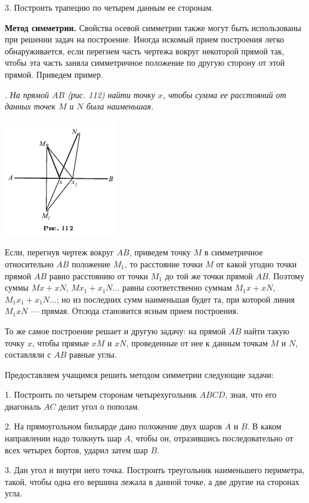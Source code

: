 \documentclass[oneside]{book}
\begin{document}
3.
Построить трапецию по четырем данным ее сторонам.



\textbf{Метод симметрии.}
Свойства осевой симметрии также могут быть использованы при решении задач на построение.
Иногда искомый прием построения легко обнаруживается, если перегнем часть чертежа вокруг некоторой прямой так, чтобы эта часть заняла симметричное положение по другую сторону от этой прямой.
Приведем пример.

.
\emph{На прямой $AB$ \emph{(рис. 112)} найти точку $x$, чтобы сумма ее расстояний от данных точек $M$ и $N$ была наименьшая.}

\includegraphics{pics/ris-112}

Если, перегнув чертеж вокруг $AB$, приведем точку $M$ в симметричное относительно $AB$ положение $M_1$, то расстояние точки $M$ от какой угодно точки прямой $AB$ равно расстоянию от точки $M_1$ до той же точки прямой $AB$.
Поэтому суммы $Mx+xN$,  $Mx_1+x_1N\dots $ равны соответственно суммам $M_1x+xN$, $M_1x_1+x_1N \dots$;
но из последних сумм наименьшая будет та, при которой линия $M_1xN$ — прямая.
Отсюда становится ясным прием построения.

То же самое построение решает и другую задачу:
на прямой $AB$ найти такую точку $x$, чтобы прямые $xM$ и $xN$, проведенные от нее к данным точкам $M$ и $N$, составляли с $AB$ равные углы.

Предоставляем учащимся решить методом симметрии следующие задачи:

\medskip

1.
Построить по четырем сторонам четырехугольник $ABCD$, зная, что его диагональ $AC$ делит угол о пополам.

2.
На прямоугольном бильярде дано положение двух шаров $A$ и $B$.
В каком направлении надо толкнуть шар $A$, чтобы он, отразившись последовательно от всех четырех бортов, ударил затем шар $B$.

3.
Дан угол и внутри него точка.
Построить треугольник наименьшего периметра, такой, чтобы одна его вершина лежала в данной точке, а две другие на сторонах угла.
\end{document}
